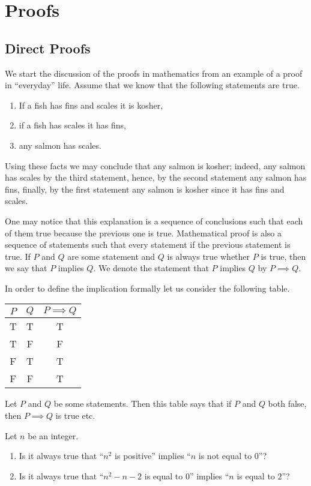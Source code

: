 \chapter{Proofs}
\section{Direct Proofs}
We start the discussion of the proofs in mathematics from an example of a proof
in ``everyday'' life. Assume that we know that the following statements are
true.
\begin{enumerate}
  \item If a fish has fins and scales it is kosher,
  \item if a fish has scales it has fins,
  \item any salmon has scales.
\end{enumerate}
Using these facts we may conclude that any salmon is kosher; indeed, any salmon
has scales by the third statement, hence, by the second statement any salmon has
fins, finally, by the first statement any salmon is kosher since it has fins and
scales.

One may notice that this explanation is a sequence of conclusions such that
each of them true because the previous one is true.
Mathematical proof is also a sequence of statements such that every statement
if the previous statement is true. If $P$ and $Q$ are some statement and $Q$ is
always true whether $P$ is true, then we say that $P$ implies $Q$. We denote
the statement that $P$ implies $Q$ by $P \implies Q$.

In order to define the implication formally let us consider the following table.
\begin{center}
  \begin{tabular}{ c | c | c }
    $P$ & $Q$ & $P \implies Q$ \\ \hline
    T   & T   & T \\
    T   & F   & F \\
    F   & T   & T \\
    F   & F   & T \\
  \end{tabular}
\end{center}
Let $P$ and $Q$ be some statements. Then this table says that if $P$ and $Q$
both false, then $P \implies Q$ is true etc.

\begin{exercise}
  Let $n$ be an integer.
  \begin{enumerate}
    \item Is it always true that ``$n^2$ is positive''
      implies ``$n$ is not equal to $0$''?
    \item Is it always true that ``$n^2 - n - 2$ is equal to $0$'' implies
      ``$n$ is equal to $2$''?
  \end{enumerate}
\end{exercise}

